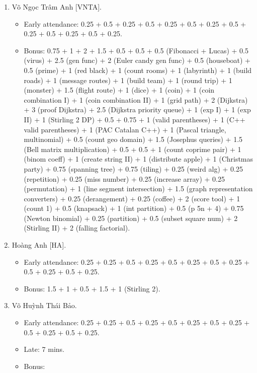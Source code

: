 \documentclass{article}
\begin{document}
\begin{enumerate}
	\item {\sc Võ Ngọc Trâm Anh [VNTA].}
	\begin{itemize}
		\item Early attendance: 0.25 + 0.5 + 0.25 + 0.5 + 0.25 + 0.5 + 0.25 + 0.5 + 0.25 + 0.5 + 0.25 + 0.5 + 0.25.
		\item Bonus: 0.75 + 1 + 2 + 1.5 + 0.5 + 0.5 + 0.5 (Fibonacci + Lucas) + 0.5 (virus) + 2.5 (gen func) + 2 (Euler candy gen func) + 0.5 (houseboat) + 0.5 (prime) + 1 (red black) + 1 (count rooms) + 1 (labyrinth) + 1 (build roads) + 1 (message routes) + 1 (build team) + 1 (round trip) + 1 (monster) + 1.5 (flight route) + 1 (dice) + 1 (coin) + 1 (coin combination I) + 1 (coin combination II) + 1 (grid path) + 2 (Dijkstra) + 3 (proof Dijkstra) + 2.5 (Dijkstra priority queue) + 1 (exp I) + 1 (exp II) + 1 (Stirling 2 DP) + 0.5 + 0.75 + 1 (valid parentheses) + 1 (C++ valid parentheses) + 1 (PAC Catalan C++) + 1 (Pascal triangle, multinomial) + 0.5 (count geo domain) + 1.5 (Josephus queries) + 1.5 (Bell matrix multiplication) + 0.5 + 0.5 + 1 (count coprime pair) + 1 (binom coeff) + 1 (create string II) + 1 (distribute apple) + 1 (Christmas party) + 0.75 (spanning tree) + 0.75 (tiling) + 0.25 (weird alg) + 0.25 (repetition) + 0.25 (miss number) + 0.25 (increase array) + 0.25 (permutation) + 1 (line segment intersection) + 1.5 (graph representation converters) + 0.25 (derangement) + 0.25 (coffee) + 2 (score tool) + 1 (count 1) + 0.5 (knapsack) + 1 (int partition) + 0.5 (p 5n + 4) + 0.75 (Newton binomial) + 0.25 (partition) + 0.5 (subset square num) + 2 (Stirling II) + 2 (falling factorial).
	\end{itemize}
	\item {\sc Hoàng Anh [HA].}
	\begin{itemize}
		\item Early attendance: 0.25 + 0.25 + 0.5 + 0.25 + 0.5 + 0.25 + 0.5 + 0.25 + 0.5 + 0.25 + 0.5 + 0.25.
		\item Bonus: 1.5 + 1 + 0.5 + 1.5 + 1 (Stirling 2).
	\end{itemize}
	\item {\sc Võ Huỳnh Thái Bảo.}
	\begin{itemize}
		\item Early attendance: 0.25 + 0.25 + 0.5 + 0.25 + 0.5 + 0.25 + 0.5 + 0.25 + 0.5 + 0.25 + 0.5 + 0.25.
		\item Late: 7 mins.
		\item Bonus: 
	\end{itemize}

\end{enumerate}
\end{document}

